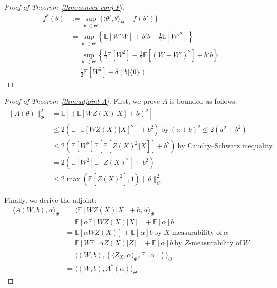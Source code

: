\documentclass{article}
\begin{document}
\begin{proof}[Proof of Theorem~\ref{thm:convex-conj-F}]
\begin{align}
f^{*}(\theta) & := \sup_{\theta' \in \Theta} \{\langle \theta', \theta \rangle_{\Theta} - f(\theta')\} \\
 & = \sup_{\theta' \in \Theta} \left\{\mathbb{E}[W' W] + b' b - \frac{1}{2} \mathbb{E}[W'^2]\right\} \\
 & = \sup_{\theta' \in \Theta} \left\{\frac{1}{2} \mathbb{E}[W^2] - \frac{1}{2}\mathbb{E}[(W - W')^2] + b' b\right\} \\
 & = \frac{1}{2} \mathbb{E}[W^2] + \delta(b|\{0\})
\end{align} 
\end{proof}

\begin{proof}[Proof of Theorem~\ref{thm:adjoint-A}]
First, we prove $A$ is bounded as follows:
\begin{align}
\| A(\theta)\|_{\Phi}^2 & = \mathbb{E}[(\mathbb{E}[W Z(X)| X] + b)^2] \\
 & \leq 2(\mathbb{E}[\mathbb{E}[W Z(X)| X]^2] + b^2) \ \text{by} \ (a + b)^2 \leq 2(a^2 + b^2) \\
 & \leq 2(\mathbb{E}[W^2] \mathbb{E}[\mathbb{E}[Z(X)^2 | X]] + b^2) \ \text{by Cauchy–Schwarz inequality} \\
 & = 2(\mathbb{E}[W^2] \mathbb{E}[Z(X)^2] + b^2) \\
 & \leq 2 \max(\mathbb{E}[Z(X)^2], 1)\|\theta\|_{\Theta}^2
\end{align}

Finally, we derive the adjoint:
\begin{align}
\langle A(W , b), \alpha \rangle_{\Phi} & = \langle \mathbb{E}[W Z(X)| X] + b , \alpha \rangle_{\Phi} \\
 & = \mathbb{E}[\alpha \mathbb{E}[W Z(X)| X]] + \mathbb{E}[\alpha] b \\
  & = \mathbb{E}[\alpha W Z(X)] + \mathbb{E}[\alpha] b  \ \text{by $X$-measurability of} \ \alpha\\
 & = \mathbb{E}[W \mathbb{E}[\alpha Z(X)| Z]] + \mathbb{E}[\alpha] b \ \text{by $Z$-measurability of} \ W \\
 & = \langle (W , b), (\langle Z_X , \alpha \rangle_{\Phi} , \mathbb{E}[\alpha]) \rangle_{\Theta} \\
 & = \langle (W , b), A^{*}(\alpha) \rangle_{\Theta}
\end{align} 
\end{proof}
\end{document}
